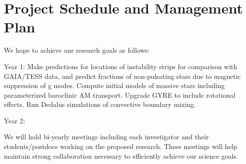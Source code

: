\section{Project Schedule and Management Plan}

We hope to achieve our research goals as follows:

Year 1: Make predictions for locations of instability strips for comparison with GAIA/TESS data, and predict fractions of non-pulsating stars due to magnetic suppression of g modes. Compute initial models of massive stars including parameterized baroclinic AM transport. Upgrade GYRE to include rotational effects. Run Dedalus simulations of convective boundary mixing.

Year 2: 

We will  hold bi-yearly meetings including each investigator and their students/postdocs working on the proposed research. These meetings will help maintain strong collaboration necessary to efficiently achieve our science goals.
